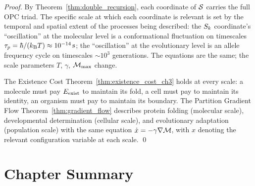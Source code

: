 \begin{proof}
By Theorem~\ref{thm:double_recursion}, each coordinate of $\mathcal{S}$ carries
the full OPC triad. The specific scale at which each coordinate is relevant
is set by the temporal and spatial extent of the processes being described:
the $S_k$ coordinate's ``oscillation'' at the molecular level is a conformational
fluctuation on timescales $\tau_p = \hbar/(k_{\mathrm{B}} T) \approx 10^{-14}\,\mathrm{s}$;
the ``oscillation'' at the evolutionary level is an allele frequency cycle on
timescales $\sim 10^3$ generations. The equations are the same; the scale
parameters $T$, $\gamma$, $\mathcal{M}_{\max}$ change.

The Existence Cost Theorem~\ref{thm:existence_cost_ch3} holds at every scale:
a molecule must pay $E_{\mathrm{exist}}$ to maintain its fold, a cell must pay to maintain
its identity, an organism must pay to maintain its boundary. The Partition
Gradient Flow Theorem~\ref{thm:gradient_flow} describes protein folding
(molecular scale), developmental determination (cellular scale), and
evolutionary adaptation (population scale) with the same equation
$\dot{x} = -\gamma\nabla\mathcal{M}$, with $x$ denoting the relevant configuration
variable at each scale. \qed
\end{proof}

\section*{Chapter Summary}
\label{sec:ch4_summary}

